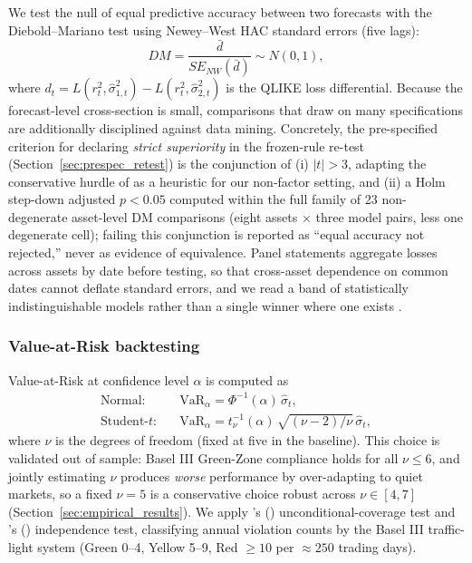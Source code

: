 We test the null of equal predictive accuracy between two forecasts with the Diebold--Mariano test \citep{diebold1995} using Newey--West HAC standard errors (five lags):
\begin{equation}
DM = \frac{\bar{d}}{SE_{NW}(\bar{d})} \sim N(0,1),
\end{equation}
where $d_t = L(r^2_t,\hat{\sigma}^2_{1,t}) - L(r^2_t,\hat{\sigma}^2_{2,t})$ is the QLIKE loss differential. Because the forecast-level cross-section is small, comparisons that draw on many specifications are additionally disciplined against data mining. Concretely, the pre-specified criterion for declaring \emph{strict superiority} in the frozen-rule re-test (Section~\ref{sec:prespec_retest}) is the conjunction of (i) $|t|>3$, adapting the conservative hurdle of \citet{harvey2016} as a heuristic for our non-factor setting, and (ii) a Holm step-down adjusted $p<0.05$ computed within the full family of 23 non-degenerate asset-level DM comparisons (eight assets $\times$ three model pairs, less one degenerate cell); failing this conjunction is reported as ``equal accuracy not rejected,'' never as evidence of equivalence. Panel statements aggregate losses across assets by date before testing, so that cross-asset dependence on common dates cannot deflate standard errors, and we read a band of statistically indistinguishable models rather than a single winner where one exists \citep{hansen2011}.

\subsubsection{Value-at-Risk backtesting}

Value-at-Risk at confidence level $\alpha$ is computed as
\begin{align}
\text{Normal:}\quad & \text{VaR}_\alpha = \Phi^{-1}(\alpha)\,\hat{\sigma}_t, \\
\text{Student-}t\text{:}\quad & \text{VaR}_\alpha = t^{-1}_\nu(\alpha)\,\sqrt{(\nu-2)/\nu}\,\hat{\sigma}_t,
\end{align}
where $\nu$ is the degrees of freedom (fixed at five in the baseline). This choice is validated out of sample: Basel III Green-Zone compliance holds for all $\nu\leq 6$, and jointly estimating $\nu$ produces \emph{worse} performance by over-adapting to quiet markets, so a fixed $\nu=5$ is a conservative choice robust across $\nu\in[4,7]$ (Section~\ref{sec:empirical_results}). We apply \citeauthor{kupiec1995}'s (\citeyear{kupiec1995}) unconditional-coverage test and \citeauthor{christoffersen1998}'s (\citeyear{christoffersen1998}) independence test, classifying annual violation counts by the Basel III traffic-light system (Green 0--4, Yellow 5--9, Red $\geq 10$ per $\approx 250$ trading days).

